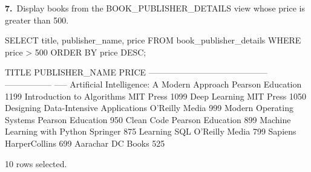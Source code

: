 \noindent\begin{minipage}{\linewidth}
\begingroup{}
{\fontsize{14}{17}\selectfont\textbf{7.}}\ Display books from the BOOK\_PUBLISHER\_DETAILS view whose price is greater than 500.\par
\endgroup\vspace{12pt}


\begin{sqlcode}
SELECT title, publisher_name, price
FROM book_publisher_details
WHERE price > 500
ORDER BY price DESC;
\end{sqlcode}

\vspace{18pt}


\begin{sqlout}[fontsize=\small]
TITLE                                       PUBLISHER_NAME     PRICE
------------------------------------------  -----------------  -----
Artificial Intelligence: A Modern Approach  Pearson Education   1199
Introduction to Algorithms                  MIT Press           1099
Deep Learning                               MIT Press           1050
Designing Data-Intensive Applications       O'Reilly Media       999
Modern Operating Systems                    Pearson Education    950
Clean Code                                  Pearson Education    899
Machine Learning with Python                Springer             875
Learning SQL                                O'Reilly Media       799
Sapiens                                     HarperCollins        699
Aarachar                                    DC Books             525

10 rows selected.
\end{sqlout}
\end{minipage}\par\vspace{24pt}

